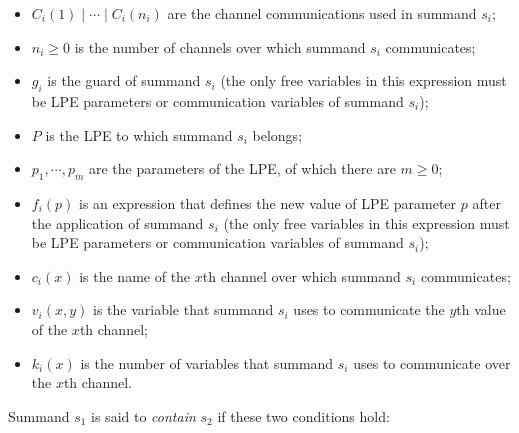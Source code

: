 \begin{itemize}
\item $C_i(1) \;|\; \cdots{} \;|\; C_i(n_i)$ are the channel communications used in summand $s_i$;
\item $n_i \geq 0$ is the number of channels over which summand $s_i$ communicates;
\item $g_i$ is the guard of summand $s_i$ (the only free variables in this expression must be LPE parameters or communication variables of summand $s_i$);
\item $P$ is the LPE to which summand $s_i$ belongs;
\item $p_1, \cdots{}, p_m$ are the parameters of the LPE, of which there are $m \geq 0$;
\item $f_i(p)$ is an expression that defines the new value of LPE parameter $p$ after the application of summand $s_i$ (the only free variables in this expression must be LPE parameters or communication variables of summand $s_i$);
\item $c_i(x)$ is the name of the $x$th channel over which summand $s_i$ communicates;
\item $v_i(x,y)$ is the variable that summand $s_i$ uses to communicate the $y$th value of the $x$th channel;
\item $k_i(x)$ is the number of variables that summand $s_i$ uses to communicate over the $x$th channel.
\end{itemize}

Summand $s_1$ is said to \emph{contain} $s_2$ if these two conditions hold:

